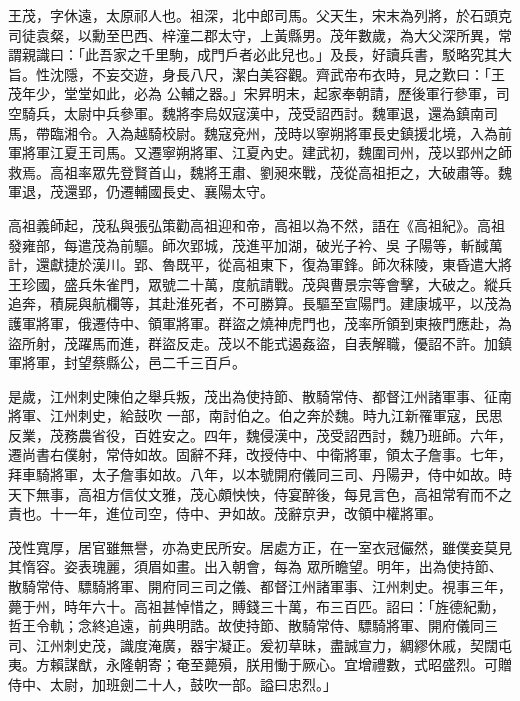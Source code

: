 
\begin{pinyinscope}

 王茂，字休遠，太原祁人也。祖深，北中郎司馬。父天生，宋末為列將，於石頭克司徒袁粲，以勳至巴西、梓潼二郡太守，上黃縣男。茂年數歲，為大父深所異，常謂親識曰：「此吾家之千里駒，成門戶者必此兒也。」及長，好讀兵書，駁略究其大旨。性沈隱，不妄交遊，身長八尺，潔白美容觀。齊武帝布衣時，見之歎曰：「王茂年少，堂堂如此，必為
 公輔之器。」宋昇明末，起家奉朝請，歷後軍行參軍，司空騎兵，太尉中兵參軍。魏將李烏奴寇漢中，茂受詔西討。魏軍退，還為鎮南司馬，帶臨湘令。入為越騎校尉。魏寇兗州，茂時以寧朔將軍長史鎮援北境，入為前軍將軍江夏王司馬。又遷寧朔將軍、江夏內史。建武初，魏圍司州，茂以郢州之師救焉。高祖率眾先登賢首山，魏將王肅、劉昶來戰，茂從高祖拒之，大破肅等。魏軍退，茂還郢，仍遷輔國長史、襄陽太守。



 高祖義師起，茂私與張弘策勸高祖迎和帝，高祖以為不然，語在《高祖紀》。高祖發雍部，每遣茂為前驅。師次郢城，茂進平加湖，破光子衿、吳
 子陽等，斬馘萬計，還獻捷於漢川。郢、魯既平，從高祖東下，復為軍鋒。師次秣陵，東昏遣大將王珍國，盛兵朱雀門，眾號二十萬，度航請戰。茂與曹景宗等會擊，大破之。縱兵追奔，積屍與航欄等，其赴淮死者，不可勝算。長驅至宣陽門。建康城平，以茂為護軍將軍，俄遷侍中、領軍將軍。群盜之燒神虎門也，茂率所領到東掖門應赴，為盜所射，茂躍馬而進，群盜反走。茂以不能式遏姦盜，自表解職，優詔不許。加鎮軍將軍，封望蔡縣公，邑二千三百戶。



 是歲，江州刺史陳伯之舉兵叛，茂出為使持節、散騎常侍、都督江州諸軍事、征南將軍、江州刺史，給鼓吹
 一部，南討伯之。伯之奔於魏。時九江新罹軍寇，民思反業，茂務農省役，百姓安之。四年，魏侵漢中，茂受詔西討，魏乃班師。六年，遷尚書右僕射，常侍如故。固辭不拜，改授侍中、中衛將軍，領太子詹事。七年，拜車騎將軍，太子詹事如故。八年，以本號開府儀同三司、丹陽尹，侍中如故。時天下無事，高祖方信仗文雅，茂心頗怏怏，侍宴醉後，每見言色，高祖常宥而不之責也。十一年，進位司空，侍中、尹如故。茂辭京尹，改領中權將軍。



 茂性寬厚，居官雖無譽，亦為吏民所安。居處方正，在一室衣冠儼然，雖僕妾莫見其惰容。姿表瑰麗，須眉如畫。出入朝會，每為
 眾所瞻望。明年，出為使持節、散騎常侍、驃騎將軍、開府同三司之儀、都督江州諸軍事、江州刺史。視事三年，薨于州，時年六十。高祖甚悼惜之，賻錢三十萬，布三百匹。詔曰：「旌德紀勳，哲王令軌；念終追遠，前典明誥。故使持節、散騎常侍、驃騎將軍、開府儀同三司、江州刺史茂，識度淹廣，器宇凝正。爰初草昧，盡誠宣力，綢繆休戚，契闊屯夷。方賴謀猷，永隆朝寄；奄至薨殞，朕用慟于厥心。宜增禮數，式昭盛烈。可贈侍中、太尉，加班劍二十人，鼓吹一部。謚曰忠烈。」




\end{pinyinscope}
